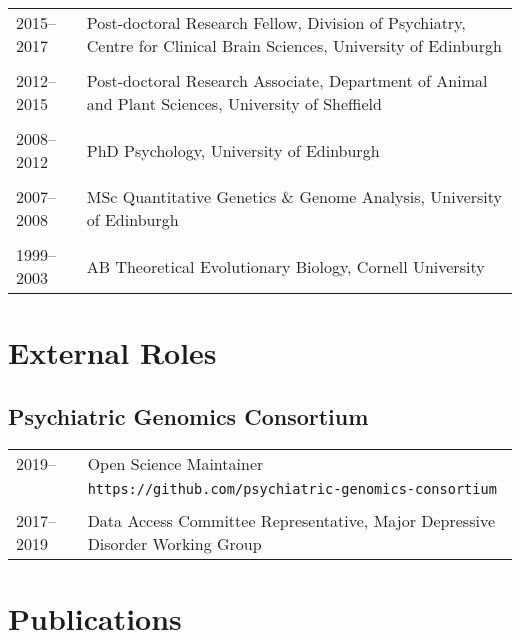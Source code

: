 \documentclass[11pt]{article}
\begin{document}
\begin{tabular}{p{3cm}p{12cm}}
2015--2017 & Post-doctoral Research Fellow, Division of Psychiatry, Centre for Clinical Brain Sciences, University of Edinburgh \\ \\

2012--2015 & Post-doctoral Research Associate, Department of Animal and Plant Sciences, University of Sheffield \\ \\

2008--2012 & PhD Psychology, University of Edinburgh \\ \\

2007--2008 & MSc Quantitative Genetics \& Genome Analysis, University of Edinburgh \\ \\

1999–2003 & AB Theoretical Evolutionary Biology, Cornell University

\end{tabular}

\section*{External Roles}

\subsection*{Psychiatric Genomics Consortium}

\begin{tabular}{p{3cm}p{12cm}}
2019-- & Open Science Maintainer\\
& \texttt{https://github.com/psychiatric-genomics-consortium} \\ \\

2017--2019 & Data Access Committee Representative, Major Depressive Disorder Working Group 

\end{tabular}

\newpage

\section*{Publications}

\nocite{*}

\setlength\bibhang{0pt}

% 
\end{document}
